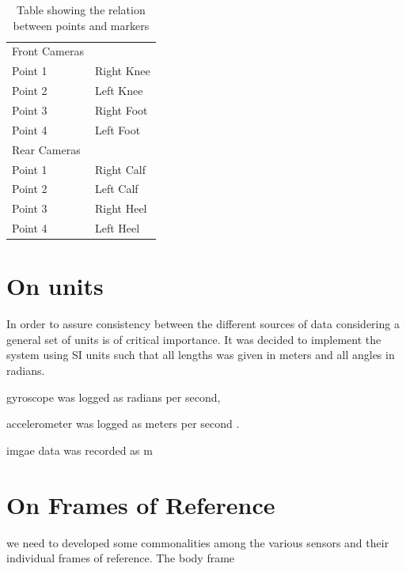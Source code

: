 \begin{table}[!ht]
\centering
\caption{Table showing the relation between points and markers}
\label{my-label}
\begin{tabular}{ll}
Front Cameras &            \\
Point 1       & Right Knee \\
Point 2       & Left Knee  \\
Point 3       & Right Foot \\
Point 4       & Left Foot  \\
Rear Cameras  &            \\
Point 1       & Right Calf \\
Point 2       & Left Calf  \\
Point 3       & Right Heel \\
Point 4       & Left Heel 
\end{tabular}
\end{table} 


\section{On units}
In order to assure consistency between the different sources of data considering a general set of units is of critical importance. It was decided to implement the system using SI units such that all lengths was given in meters and all angles in radians.

gyroscope was logged as radians per second,

accelerometer was logged as meters per second .

imgae data was recorded as m

\section{On Frames of Reference}
we need to developed some commonalities among the various sensors and their individual frames of reference. The body frame






